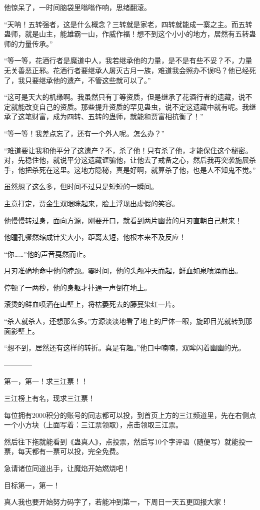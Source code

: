 \begin{this_body}
他惊呆了，一时间脑袋里嗡嗡作响，思绪翻滚。

“天呐！五转强者，这是什么概念？三转就是家老，四转就能成一寨之主。而五转蛊师，就是山主，能雄霸一山，作威作福！想不到这个小小的地方，居然有五转蛊师的力量传承。”

“等一等，花酒行者是魔道中人，我若继承他的力量，是不是有些不妥？不，力量无关善恶正邪。花酒行者要继承人屠灭古月一族，难道我会照办不误吗？他已经死了，我只要继承他的遗产，不管这些就可以了。”

“这可是天大的机缘啊。我虽然只有丁等资质，但是继承了花酒行者的遗藏，说不定就能改变自己的资质。那些提升资质的罕见蛊虫，说不定这遗藏中就有呢。我继承了这笔财富，成为四转、五转的蛊师，就能和贾富相抗衡了！”

“等一等！我差点忘了，还有一个外人呢。怎么办？”

“难道要让我和他平分了这遗产？不，杀了他！只有杀了他，才能保住这个秘密。对，先稳住他，就说平分这遗藏诓骗他，让他去了戒备之心，然后我再突袭施展杀手，他把杀死在这里。这地方隐秘，真是好啊，就算杀了他，也是人不知鬼不觉。”

虽然想了这么多，但时间不过只是短短的一瞬间。

主意打定，贾金生双眼眯起来，脸上浮现出虚假的笑容。

他慢慢转过身，面向方源，刚要开口，就看到两片幽蓝的月刃直朝自己射来！

他瞳孔骤然缩成针尖大小，距离太短，他根本来不及反应！

“你……”他的声音戛然而止。

月刃准确地命中他的脖颈。霎时间，他的头颅冲天而起，鲜血如泉喷涌而出。

停顿了一两秒，他的身躯才扑通一声倒在地上。

滚烫的鲜血喷洒在山壁上，将枯萎死去的藤蔓染红一片。

“杀人就杀人，还想那么多。”方源淡淡地看了地上的尸体一眼，旋即目光就转到那面影壁上。

“想不到，居然还有这样的转折。真是有趣。”他口中喃喃，双眸闪着幽幽的光。

------------

第一，第一！求三江票！！

三江榜上有名，现求三江票！

每位拥有2000积分的账号的同志都可以投，到首页上方的三江频道里，先在右侧点一个小方块（上面写着：三江票领取），点击领取三江票。

然后往下拖就能看到《蛊真人》，点投票，然后写10个字评语（随便写）就能投一票，每天都有一票可以投，完全免费。

急请诸位同道出手，让魔焰开始燃烧吧！

目标第一，第一！

真人我也要开始努力码字了，若能冲到第一，下周日一天五更回报大家！

\end{this_body}

